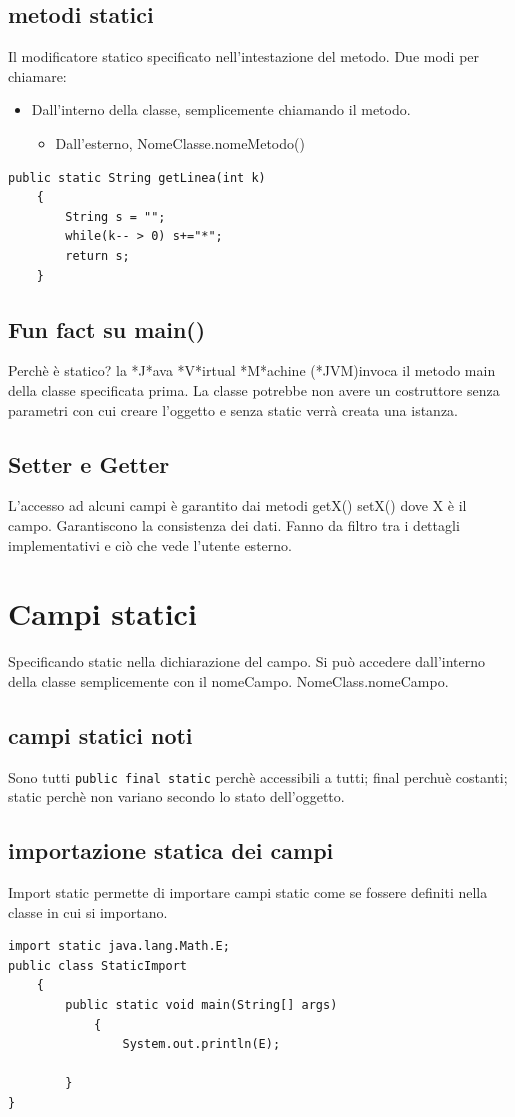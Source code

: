 \documentclass[11pt]{article}
\begin{document}
\subsection{metodi statici}
\label{sec:orgfce7480}
Il modificatore statico specificato nell'intestazione del metodo.
Due modi per chiamare:
\begin{itemize}
\item Dall'interno della classe, semplicemente chiamando il metodo.
\begin{itemize}
\item Dall'esterno, NomeClasse.nomeMetodo()
\end{itemize}
\end{itemize}
\begin{verbatim}
public static String getLinea(int k)
    {
        String s = "";
        while(k-- > 0) s+="*";
        return s;
    }
\end{verbatim}
\subsection{Fun fact su main()}
\label{sec:org8a6c9cb}
Perchè è statico? la *J*ava *V*irtual *M*achine (*JVM)invoca il metodo main della classe specificata prima. La classe potrebbe non avere un costruttore senza parametri con cui creare l'oggetto e senza static verrà creata una istanza.
\subsection{Setter e Getter}
\label{sec:orgb2d5163}
L'accesso ad alcuni campi è garantito dai metodi getX() setX() dove X è il campo. Garantiscono la consistenza dei dati. Fanno da filtro tra i dettagli implementativi e ciò che vede l'utente esterno.
\section{Campi statici}
\label{sec:orgab177cd}
Specificando static nella dichiarazione del campo. Si può accedere dall'interno della classe semplicemente con il nomeCampo. NomeClass.nomeCampo.
\subsection{campi statici noti}
\label{sec:org01eef3e}
Sono tutti \texttt{public final static} perchè accessibili a tutti; final perchuè costanti; static perchè non variano secondo lo stato dell'oggetto.
\subsection{importazione statica dei campi}
\label{sec:org2f081dc}
Import static permette di importare campi static come se fossere definiti nella classe in cui si importano.
\begin{verbatim}
import static java.lang.Math.E;
public class StaticImport
    {
        public static void main(String[] args)
            {
                System.out.println(E);

        }
}
\end{verbatim}
\end{document}
